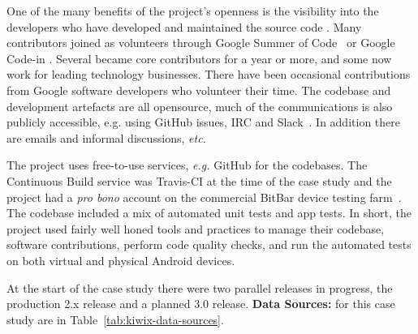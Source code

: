 One of the many benefits of the project’s openness is the visibility into the developers who have developed and maintained the source code . Many contributors joined as volunteers through Google Summer of Code~ or Google Code-in . Several became core contributors for a year or more, and some now work for leading technology businesses. There have been occasional contributions from Google software developers who volunteer their time. The codebase and development artefacts are all opensource, much of the communications is also publicly accessible, e.g. using GitHub issues, IRC and Slack~. In addition there are emails and informal discussions, \emph{etc.}

The project uses free-to-use services, \emph{e.g.} GitHub for the codebases. The Continuous Build service was Travis-CI at the time of the case study  and the project had a \emph{pro bono} account on the commercial BitBar device testing farm~. The codebase included a mix of automated unit tests and app tests. In short, the project used fairly well honed tools and practices to manage their codebase, software contributions, perform code quality checks, and run the automated tests on both virtual and physical Android devices.

At the start of the case study there were two parallel releases in progress, the production 2.x release and a planned 3.0 release.
%
\textbf{Data Sources:} for this case study are in Table~\ref{tab:kiwix-data-sources}.

